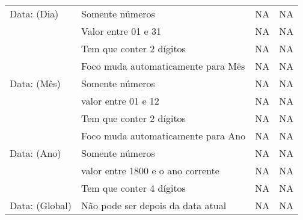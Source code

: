\begin{longtable}{|p{}|p{}|p{}|p{}|}
Data: (Dia) & Somente números & NA & NA \\ \cline{2-4} & Valor entre 01 e 31 & NA & NA \\ \cline{2-4} & Tem que conter 2 dígitos & NA & NA \\ \cline{2-4} & Foco muda automaticamente para Mês & NA & NA \\ \hline
Data: (Mês) & Somente números & NA & NA \\ \cline{2-4} & valor entre 01 e 12 & NA & NA \\ \cline{2-4} & Tem que conter 2 dígitos & NA & NA \\ \cline{2-4} & Foco muda automaticamente para Ano & NA & NA \\ \hline
Data: (Ano) & Somente números & NA & NA \\ \cline{2-4} & valor entre 1800 e o ano corrente & NA & NA \\ \cline{2-4} & Tem que conter 4 dígitos & NA & NA \\ \hline
Data: (Global) & Não pode ser depois da data atual & NA & NA \\ \hline

\end{longtable}
